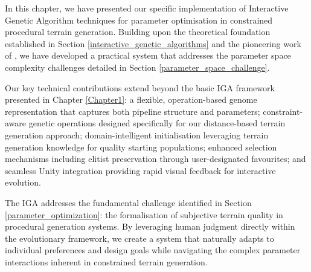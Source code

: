 In this chapter, we have presented our specific implementation of Interactive Genetic Algorithm techniques for parameter optimisation in constrained procedural terrain generation. Building upon the theoretical foundation established in Section \ref{interactive_genetic_algorithms} and the pioneering work of \textcite{Walsh10}, we have developed a practical system that addresses the parameter space complexity challenges detailed in Section \ref{parameter_space_challenge}.

Our key technical contributions extend beyond the basic IGA framework presented in Chapter \ref{Chapter1}: a flexible, operation-based genome representation that captures both pipeline structure and parameters; constraint-aware genetic operations designed specifically for our distance-based terrain generation approach; domain-intelligent initialisation leveraging terrain generation knowledge for quality starting populations; enhanced selection mechanisms including elitist preservation through user-designated favourites; and seamless Unity integration providing rapid visual feedback for interactive evolution.

The IGA addresses the fundamental challenge identified in Section \ref{parameter_optimization}: the formalisation of subjective terrain quality in procedural generation systems. By leveraging human judgment directly within the evolutionary framework, we create a system that naturally adapts to individual preferences and design goals while navigating the complex parameter interactions inherent in constrained terrain generation.